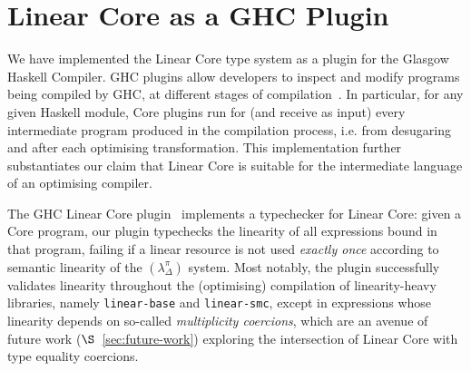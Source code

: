 \documentclass[acmsmall,review]{acmart}
\newcommand{\notyetcolorname}{light yellow}
\begin{document}

\section{Linear Core as a GHC Plugin\label{sec:discuss:implementation}}

We have implemented the Linear Core type system as a plugin for the Glasgow
Haskell Compiler.
GHC plugins allow developers to inspect and modify programs being compiled by
GHC, at different stages of compilation~\cite{10.1145/3331545.3342599}.
%
In particular, for any given Haskell module, Core plugins run for (and receive
as input) every intermediate program produced in the compilation process, i.e.
from desugaring and after each optimising transformation.
%
This implementation further substantiates our claim that Linear Core is
suitable for the intermediate language of an optimising compiler.

The GHC Linear Core plugin~\cite{cite:linear-core-plugin} implements a
typechecker for Linear Core: given a Core program, our plugin typechecks the
linearity of all expressions bound in that program, failing if a linear
resource is not used \emph{exactly once} according to semantic linearity of the
$(\lambda^\pi_\Delta)$ system.
%
Most notably, the plugin successfully validates linearity throughout the
(optimising) compilation of linearity-heavy libraries, namely
\texttt{linear-base} and \texttt{linear-smc}, except in expressions whose
linearity depends on so-called \emph{multiplicity coercions}, which are an
avenue of future work ($\S$~\ref{sec:future-work}) exploring the intersection
of Linear Core with type equality coercions.


\end{document}
